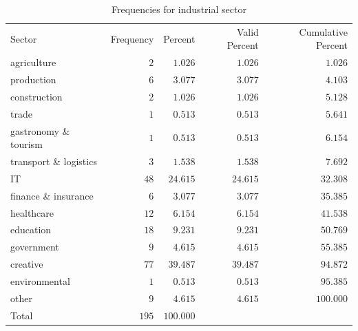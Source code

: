 \documentclass[
  a4paper,  %
  twoside,  %
  bibliography=totoc,
  headsepline,
  cleardoublepage=empty,
  parskip=half,
  draft=false
]{scrbook}
\begin{document}
\begin{table}[h]
	\centering
	\caption{Frequencies for industrial sector}
	\label{tab:frequenciesForBranch}
	{
		\begin{tabular}{lrrrr}
			\toprule
			Sector & Frequency & Percent & Valid Percent & Cumulative Percent  \\
			\cmidrule[0.4pt]{1-5}
			agriculture & $2$ & $1.026$ & $1.026$ & $1.026$  \\
			production & $6$ & $3.077$ & $3.077$ & $4.103$  \\
			construction & $2$ & $1.026$ & $1.026$ & $5.128$  \\
			trade & $1$ & $0.513$ & $0.513$ & $5.641$  \\
			gastronomy \& tourism & $1$ & $0.513$ & $0.513$ & $6.154$  \\
			transport \& logistics & $3$ & $1.538$ & $1.538$ & $7.692$  \\
			IT & $48$ & $24.615$ & $24.615$ & $32.308$  \\
			finance \& insurance & $6$ & $3.077$ & $3.077$ & $35.385$  \\
			healthcare & $12$ & $6.154$ & $6.154$ & $41.538$  \\
			education & $18$ & $9.231$ & $9.231$ & $50.769$  \\
			government & $9$ & $4.615$ & $4.615$ & $55.385$  \\
			creative & $77$ & $39.487$ & $39.487$ & $94.872$  \\
			environmental & $1$ & $0.513$ & $0.513$ & $95.385$  \\
			other & $9$ & $4.615$ & $4.615$ & $100.000$  \\
			Total & $195$ & $100.000$ & $ $ & $ $  \\
			\bottomrule
		\end{tabular}
	}
\end{table}
\end{document}
